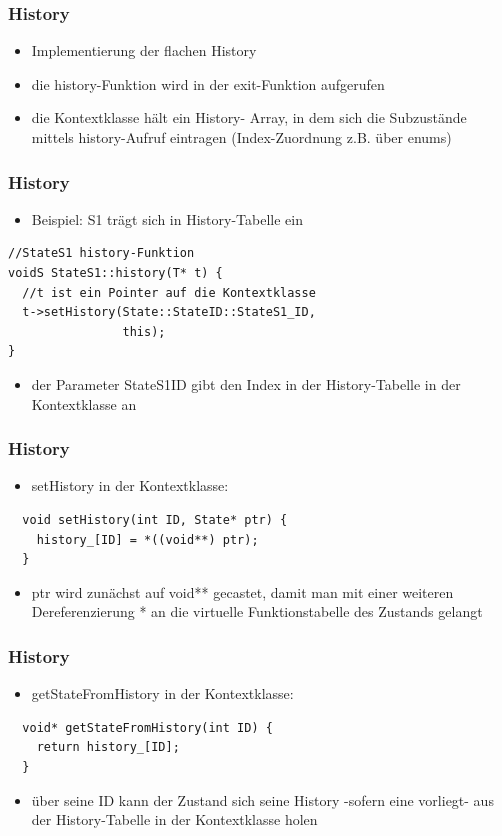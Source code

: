 \documentclass{beamer}
\begin{document}
\begin{frame}
 \frametitle{History}
 \begin{itemize}
  \item Implementierung der flachen History
  \item die history-Funktion  wird in der exit-Funktion aufgerufen
  \item die Kontextklasse h\"alt ein History- Array,
  in dem sich die Subzust\"ande mittels history-Aufruf eintragen (Index-Zuordnung z.B. \"uber enums)
 \end{itemize}
\end{frame}

\begin{frame}[fragile]
 \frametitle{History}
 \begin{itemize}
  \item Beispiel: S1 tr\"agt sich in History-Tabelle ein
 \end{itemize}
 \begin{lstlisting}
//StateS1 history-Funktion
voidS StateS1::history(T* t) {
  //t ist ein Pointer auf die Kontextklasse
  t->setHistory(State::StateID::StateS1_ID,
                this);
}
 \end{lstlisting}
 \begin{itemize}
  \item der Parameter StateS1ID gibt den Index in der History-Tabelle in der Kontextklasse an
 \end{itemize}
\end{frame}

\begin{frame}[fragile]
 \frametitle{History}
 \begin{itemize}
  \item setHistory in der Kontextklasse:
 \end{itemize}
 \begin{lstlisting}
  void setHistory(int ID, State* ptr) {
    history_[ID] = *((void**) ptr);
  }
 \end{lstlisting}
 \begin{itemize}
  \item ptr wird zun\"achst auf void** gecastet, damit man mit einer weiteren Dereferenzierung * an die virtuelle Funktionstabelle des Zustands gelangt
 \end{itemize}
\end{frame}

\begin{frame}[fragile]
 \frametitle{History}
 \begin{itemize}
  \item getStateFromHistory in der Kontextklasse:
 \end{itemize}
 \begin{lstlisting}
  void* getStateFromHistory(int ID) {
    return history_[ID];
  }
 \end{lstlisting}
 \begin{itemize}
  \item \"uber seine ID kann der Zustand sich seine History -sofern eine vorliegt- aus der History-Tabelle in der Kontextklasse holen
 \end{itemize}
\end{frame}
\end{document}
